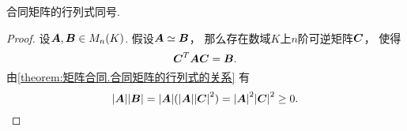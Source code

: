 \begin{proposition}
合同矩阵的行列式同号.
\begin{proof}
设\(\boldsymbol{A},\boldsymbol{B} \in M_n(K)\).
假设\(\boldsymbol{A}\simeq\boldsymbol{B}\)，
那么存在数域\(K\)上\(n\)阶可逆矩阵\(\boldsymbol{C}\)，
使得\begin{equation*}
	\boldsymbol{C}^T \boldsymbol{A} \boldsymbol{C} = \boldsymbol{B}.
\end{equation*}
由\cref{theorem:矩阵合同.合同矩阵的行列式的关系} 有\begin{equation*}
	\abs{\boldsymbol{A}} \abs{\boldsymbol{B}}
	= \abs{\boldsymbol{A}} (\abs{\boldsymbol{A}} \abs{\boldsymbol{C}}^2)
	= \abs{\boldsymbol{A}}^2 \abs{\boldsymbol{C}}^2
	\geq 0.
	\qedhere
\end{equation*}
\end{proof}
\end{proposition}

